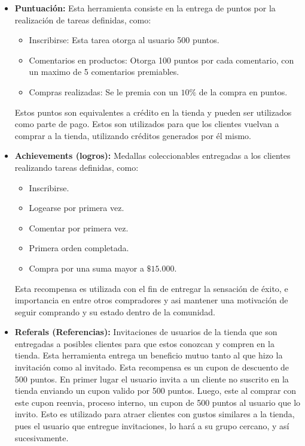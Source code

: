\begin{itemize}
    \item {\bf Puntuación:}
        Esta herramienta consiste en la entrega de puntos por la realización
        de tareas definidas, como: 

	\begin{itemize}
	\item Inscribirse:  Esta tarea otorga al usuario 500 puntos.
	\item Comentarios en productos: Otorga 100 puntos por cada comentario, 
	con un maximo de 5 comentarios premiables.
	\item Compras realizadas: Se le premia con un $10\%$ de la compra en
	puntos.
	\end{itemize} 

        Estos puntos son equivalentes a crédito en la tienda y pueden ser
        utilizados como parte de pago.
        Estos son utilizados para que los clientes vuelvan a comprar a la tienda,
        utilizando créditos generados por él mismo.

    \item {\bf Achievements (logros):}
        Medallas coleccionables entregadas a los clientes realizando tareas
        definidas, como:

        \begin{itemize}
        \item Inscribirse.
	\item Logearse por primera vez.
        \item Comentar por primera vez.
        \item Primera orden completada.
	\item Compra por una suma mayor a $\$15.000$.
        \end{itemize}

        Esta recompensa es utilizada con el fin de entregar la sensación de éxito,
        e importancia en entre otros compradores y asi mantener una motivación
        de seguir comprando y su estado dentro de la comunidad.

    \item {\bf Referals (Referencias):}
        Invitaciones de usuarios de la tienda que son entregadas a posibles
        clientes para que estos conozcan y compren en la tienda.
        Esta herramienta entrega un beneficio mutuo tanto al que hizo la invitación
        como al invitado. Esta recompensa es un cupon de descuento de 500 puntos.
	En primer lugar el usuario invita a un cliente no suscrito en la tienda enviando
	un cupon valido por 500 puntos. Luego, este al comprar con este cupon reenvia, 
	proceso interno, un cupon de 500 puntos al usuario que lo invito.	
        Esto es utilizado para atraer clientes con gustos similares
        a la tienda, pues el usuario que entregue invitaciones, lo hará a su
        grupo cercano, y así sucesivamente.

\end{itemize}

